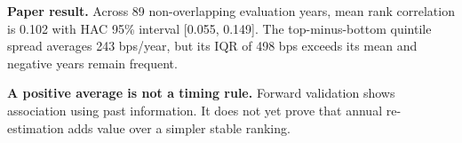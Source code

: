 \textbf{Paper result.} Across 89 non-overlapping evaluation years, mean
rank correlation is 0.102 with HAC 95\% interval {[}0.055, 0.149{]}. The
top-minus-bottom quintile spread averages 243 bps/year, but its IQR of
498 bps exceeds its mean and negative years remain frequent.

\textbf{A positive average is not a timing rule.} Forward validation
shows association using past information. It does not yet prove that
annual re-estimation adds value over a simpler stable ranking.

